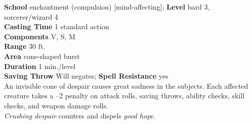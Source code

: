 \textbf{School} enchantment (compulsion) [mind-affecting]; \textbf{Level} bard 3, sorcerer/wizard 4\\
\textbf{Casting Time} 1 standard action\\
\textbf{Components} V, S, M\\
\textbf{Range} 30 ft.\\
\textbf{Area} cone-shaped burst\\
\textbf{Duration} 1 min./level\\
\textbf{Saving Throw }Will negates; \textbf{Spell Resistance} yes\\
An invisible cone of despair causes great sadness in the subjects. Each affected creature takes a --2 penalty on attack rolls, saving throws, ability checks, skill checks, and weapon damage rolls.\\
\textit{Crushing despair} counters and dispels \textit{good hope}.\\
